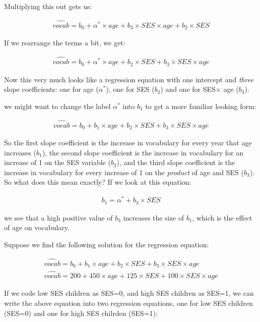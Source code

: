 Multiplying this out gets us:

\begin{eqnarray}
\widehat{vocab} = b_0 + \alpha^* \times age + b_3 \times SES  \times age + b_2 \times SES
\end{eqnarray}

If we rearrange the terms a bit, we get:

\begin{eqnarray}
\widehat{vocab} = b_0 + \alpha^* \times age + b_2 \times SES + b_3 \times SES  \times age
\end{eqnarray}

Now this very much looks like a regression equation with one intercept and \textit{three} slope coefficients: one for age ($\alpha^*$), one for SES ($b_2$) and one for SES$\times$ age ($b_3$).


we might want to change the label $\alpha^*$ into $b_1$ to get a more familiar looking form:

\begin{eqnarray}
\widehat{vocab} = b_0 + b_1\times age + b_2 \times SES + b_3 \times SES  \times age
\end{eqnarray}

So the first slope coefficient is the increase in vocabulary for every year that age increases ($b_1$), the second slope coefficient is the increase in vocabulary for an increase of 1 on the SES variable ($b_2$), and the third slope coefficient is the increase in vocabulary for every increase of 1 on the \textit{product} of age and SES ($b_3$).
\\
So what does this mean exactly? If we look at this equation:

\begin{eqnarray}
b_1 = \alpha^* + b_3 \times SES
\end{eqnarray}

we see that a high positive value of $b_3$ increases the size of $b_1$, which is the effect of age on vocabulary.

Suppose we find the following solution for the regression equation:

\begin{eqnarray}
\widehat{vocab} = b_0 + b_1 \times age + b_2 \times SES + b_3 \times SES  \times age  \\
\widehat{vocab} = 200 + 450 \times age + 125 \times SES + 100 \times SES  \times age
\end{eqnarray}

If we code low SES children as SES=0, and high SES children as SES=1, we can write the above equation into two regression equations, one for low SES children (SES=0) and one for high SES chilrden (SES=1):

